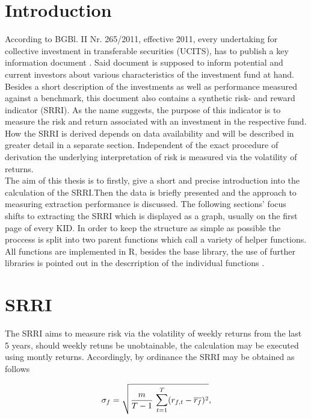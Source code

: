 \documentclass[aodsor,preprint]{imsart}
\numberwithin{equation}{section}
\theoremstyle{plain}
\begin{document}
\section{Introduction}
According to BGBl. II Nr. 265/2011, effective 2011, every undertaking for collective investment in transferable securities (UCITS), has to publish a key information document \citep{BGB1}. Said document is supposed to inform potential and current investors about various characteristics of the investment fund at hand. Besides a short description of the investments as well as performance measured against a benchmark, this document also contains a synthetic risk- and reward indicator (SRRI). As the name suggests, the purpose of this indicator is to measure the risk and return associated with an investment in the respective fund. How the SRRI is derived depends on data availability and will be described in greater detail in a separate section. Independent of the exact procedure of derivation the underlying interpretation of risk is measured via the volatility of returns.\\
The aim of this thesis is to firstly, give a short and precise introduction into the calculation of the SRRI.Then the data is briefly presented and the approach to measuring extraction performance is discussed. The following sections' focus shifts to extracting the SRRI which is displayed as a graph, usually on the first page of every KID. In order to keep the structure as simple as possible the proccess is split into two parent functions which call a variety of helper functions. All functions are implemented in R, besides the base library, the use of further libraries is pointed out in the descrription of the individual functions \citep{base}.

\newpage

\section{SRRI}

The SRRI aims to measure risk via the volatility of weekly returns from the last 5 years, should weekly retuns be unobtainable, the calculation may be executed using montly returns. Accordingly, by ordinance the SRRI may be obtained as follows

\[
\sigma_f = \sqrt{\frac{m}{T - 1}\text{ }\mathlarger{\sum}_{t = 1}^{T} (r_{f, t} - \overline{r_f})^2},
\]
\end{document}
